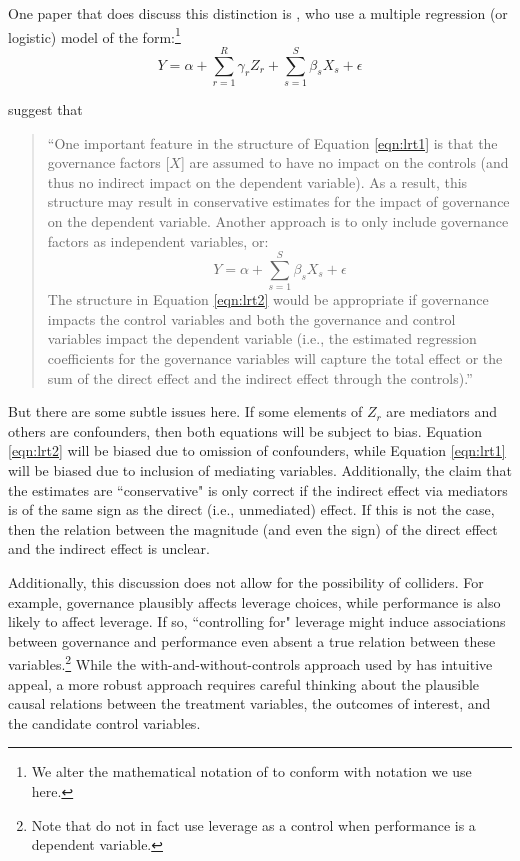 \documentclass[12pt,reqno,titlepage]{amsart}
\theoremstyle{definition}
\begin{document}
\begin{doublespace}
One paper that does discuss this distinction is \citet{Larcker:2007aa}, who use a multiple regression (or logistic) model of the form:\footnote{We alter the mathematical notation of  \citet{Larcker:2007aa} to conform with notation we use here.}
\begin{equation}
Y = \alpha + \sum_{r=1}^R \gamma _r Z_r + \sum_{s=1}^S \beta_s X_s + \epsilon \label{eqn:lrt1}
\end{equation}

\noindent \citet{Larcker:2007aa} suggest that 

\begin{quote}\begin{singlespace} 
``One important feature in the structure of Equation \ref{eqn:lrt1} is that the governance factors [$X$] are assumed to have no impact on the controls (and thus no indirect impact on the dependent variable). 
As a result, this structure may result in conservative estimates for the impact of governance on the dependent variable. Another approach is to only include governance factors as independent variables, or:
\begin{equation}
Y = \alpha + \sum_{s =1}^S \beta_s X_s + \epsilon \label{eqn:lrt2}
\end{equation}
The structure in Equation \ref{eqn:lrt2} would be appropriate if governance impacts the control variables and both the governance and control variables impact the dependent variable (i.e., the estimated regression coefficients for the governance variables will capture the total effect or the sum of the direct effect and the indirect effect through the controls).''
\end{singlespace} \end{quote}

But there are some subtle issues here.
If some elements of $Z_r$ are mediators and others are confounders, then both equations will be subject to bias. 
Equation \ref{eqn:lrt2} will be biased due to omission of confounders, while Equation \ref{eqn:lrt1}  will be biased due to inclusion of mediating variables.
Additionally, the claim that the estimates are ``conservative" is only correct if the indirect effect via mediators is of the same sign as the direct (i.e., unmediated) effect. 
If this is not the case, then the relation between the magnitude (and even the sign) of the direct effect and the indirect effect is unclear.

Additionally, this discussion does not allow for the possibility of colliders.
For example, governance plausibly affects leverage choices, while performance is also likely to affect leverage.
If so, ``controlling for" leverage might induce associations between governance and performance even absent a true relation between these variables.\footnote{
Note that \citet{Larcker:2007aa} do not in fact use leverage as a control when performance is a dependent variable.}
While the with-and-without-controls approach used by \citet{Larcker:2007aa} has intuitive appeal, a more robust approach requires careful thinking about the plausible causal relations between the treatment variables, the outcomes of interest, and the candidate control variables.


\end{doublespace}
\end{document}
